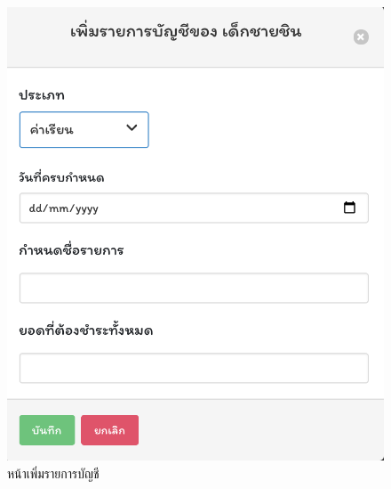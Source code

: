 \begin{itemize}
\begin{figure}
    \end{figure}




  \begin{figure}
    \begin{center}
    \includegraphics[scale=0.75]{images/CreatePayment.png}
    \end{center}
    \caption[หน้าเพิ่มรายการบัญชี]{หน้าเพิ่มรายการบัญชี}
    \label{fig:CreatePayment}
    \end{figure}



\end{itemize}
